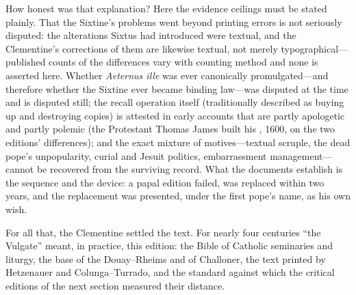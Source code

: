 How honest was that explanation? Here the evidence ceilings must be
stated plainly. That the Sixtine's problems went beyond printing errors
is not seriously disputed: the alterations Sixtus had introduced were
textual, and the Clementine's corrections of them are likewise textual,
not merely typographical---published counts of the differences vary with
counting method and none is asserted here. Whether \textit{Aeternus ille} was ever canonically
promulgated---and therefore whether the Sixtine ever became binding
law---was disputed at the time and is disputed still; the recall
operation itself (traditionally described as buying up and destroying
copies) is attested in early accounts that are partly apologetic and
partly polemic (the Protestant Thomas James built his , 1600, on the two editions' differences); and the exact mixture
of motives---textual scruple, the dead pope's unpopularity, curial and
Jesuit politics, embarrassment management---cannot be recovered from the
surviving record. What the documents establish is the sequence and the
device: a papal edition failed, was replaced within two years, and the
replacement was presented, under the first pope's name, as his own
wish.

For all that, the Clementine settled the text. For nearly four centuries
``the Vulgate'' meant, in practice, this edition: the Bible of Catholic
seminaries and liturgy, the base of the Douay--Rheims and of Challoner,
the text printed by Hetzenauer and Colunga--Turrado, and the standard
against which the critical editions of the next section measured their
distance.
